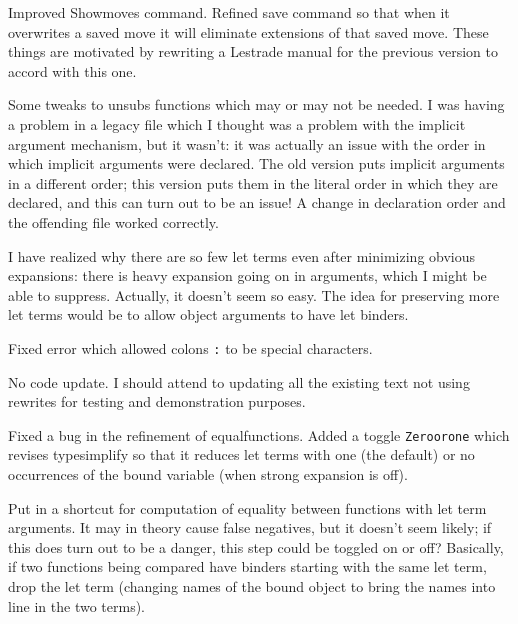 \documentclass[12pt]{article}
\begin{document}
\begin{description}
\begin{enumerate}
\end{enumerate}

\item[4/14/2020:]  Improved Showmoves command.  Refined save command so that when it overwrites a saved move
it will eliminate extensions of that saved move.  These things are motivated by rewriting a Lestrade manual for the previous version to accord with this one.

\item[4/13/2020:]  Some tweaks to unsubs functions which may or may not be needed.  I was having a problem in a legacy file which I thought was a problem with the implicit argument mechanism, but it wasn't:  it was actually an issue with the order in which implicit arguments were declared.  The old version puts implicit arguments in a different order;  this version puts them in the literal order in which they are declared, and this can turn out to be an issue!  A change in declaration order and the offending file worked correctly.

\item[4/12/2020:]  I have realized why there are so few let terms even after minimizing obvious expansions:  there is heavy expansion going on in arguments, which I might be able to suppress.  Actually, it doesn't seem so easy.  The idea for preserving more let terms would be to allow object arguments to have let binders.

Fixed error which allowed colons \verb|:| to be special characters.

\item[4/10/2020:]  No code update.  I should attend to updating all the existing text not using rewrites for testing and demonstration purposes.

\item[4/9/2020:]  Fixed a bug in the refinement of equalfunctions.  Added a toggle {\tt Zeroorone}
which revises typesimplify so that it reduces let terms with one (the default) or no occurrences of the bound variable (when strong expansion is off).

\item[4/8/2020:]  Put in a shortcut for computation of equality between functions with let term arguments.
It may in theory cause false negatives, but it doesn't seem likely;  if this does turn out to be a danger,
this step could be toggled on or off?   Basically, if two functions being compared have binders starting with
the same let term, drop the let term (changing names of the bound object to bring the names into line in the
two terms).


\end{description}
\end{document}
